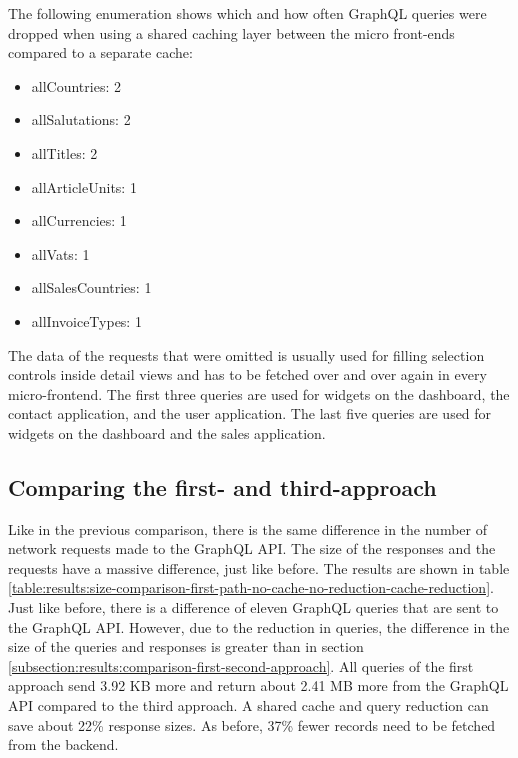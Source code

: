 \noindent The following enumeration shows which and how often GraphQL queries were dropped when using a shared caching layer between the micro front-ends compared to a separate cache:

\begin{itemize}
  \item allCountries: 2
  \item allSalutations: 2
  \item allTitles: 2
  \item allArticleUnits: 1
  \item allCurrencies: 1
  \item allVats: 1
  \item allSalesCountries: 1
  \item allInvoiceTypes: 1
\end{itemize}

\noindent The data of the requests that were omitted is usually used for filling selection controls inside detail views and has to be fetched over and over again in every micro-frontend. The first three queries are used for widgets on the dashboard, the contact application, and the user application. The last five queries are used for widgets on the dashboard and the sales application.

\subsection{Comparing the first- and third-approach}\label{subsection:results:comparison-first-third-approach}

Like in the previous comparison, there is the same difference in the number of network requests made to the GraphQL \ac{API}. The size of the responses and the requests have a massive difference, just like before. The results are shown in table \ref{table:results:size-comparison-first-path-no-cache-no-reduction-cache-reduction}. Just like before, there is a difference of eleven GraphQL queries that are sent to the GraphQL \ac{API}. However, due to the reduction in queries, the difference in the size of the queries and responses is greater than in section \ref{subsection:results:comparison-first-second-approach}. All queries of the first approach send 3.92 KB more and return about 2.41 MB more from the GraphQL \ac{API} compared to the third approach. A shared cache and query reduction can save about 22\% response sizes. As before, 37\% fewer records need to be fetched from the backend.

